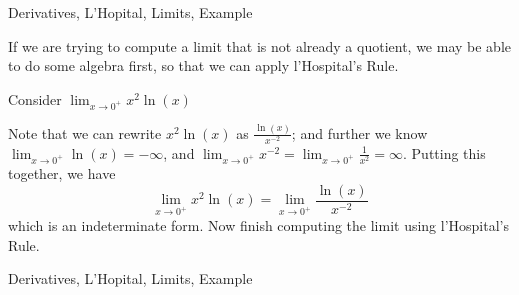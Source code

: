 
\begin{tagblock}{Derivatives, L'Hopital, Limits, Example}

\begin{question}

If we are trying to compute a limit that is not already a quotient, we may be able to do some algebra first, so that we can apply l'Hospital's Rule. 
\bigskip

  Consider 
 $\displaystyle \lim_{x\to 0^+} {x^2} \ln(x)$ 
 
 Note that we can rewrite $x^2 \ln(x)$ as $\displaystyle \frac{\ln(x)}{x^{-2}}$; and further we know $\displaystyle \lim_{x \to 0^+} \ln(x) = - \infty$, and $\displaystyle \lim_{x \to 0^+} x^{-2} = \lim_{x \to 0^+} \frac{1}{x^2} = \infty$.  Putting this together, we have 
 \[  \lim_{x\to 0^+} {x^2} \ln(x) =  \lim_{x\to 0^+} \frac{\ln(x)}{x^{-2}} \]
 which is an indeterminate form.  Now finish computing the limit using  l'Hospital's Rule. 


	
\begin{tags}
	   Derivatives, L'Hopital, Limits, Example

\end{tags}
	
\begin{diary}
\end{diary}
	
\begin{solution}
	   
\end{solution}
	
\end{question}

\end{tagblock}


